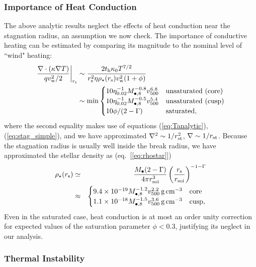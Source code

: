 \documentclass[usenatbib,fleqn]{mn2e}
\begin{document}
\subsubsection{Importance of Heat Conduction}

The above analytic results neglect the effects of heat conduction near the stagnation radius, an assumption we now check.  The importance of conductive heating can be estimated by comparing its magnitude to the nominal level of ``wind" heating:
\begin{align}
  \left.\frac{\nabla\cdot(\kappa \nabla T)}{q v_{\rm
w}^{2}/2}\right|_{r_{\rm s}} &\sim \frac{2t_{\rm h}\kappa_0
T^{7/2}}{r_{\rm s}^{2}\eta \rho_{\star}(r_{\rm s}) v_{\rm w}^{2}(1+\phi)}
\nonumber \\ &\sim {\rm min}
  \begin{cases}
  10 \eta_{0.02}^{-1}
M_{\bullet,8}^{-0.8} v_{500}^{6.8} &  \text{unsaturated (core)}\\
 10 \eta_{0.02}^{-1}
M_{\bullet,8}^{-0.5} v_{500}^{5.4} &  \text{unsaturated (cusp)}\\
  10 \phi/(2-\Gamma) & \text{saturated},
  \end{cases}
 \label{eq:rhors}
\end{align}
where the second equality makes use of equations (\ref{eq:Tanalytic}), (\ref{eq:stag_simple}), and we have approximated $\nabla^{2} \sim 1/r_{\rm st}^{2}$, $\nabla \sim 1/r_{\rm st}$.  Because the stagnation radius is usually well inside the break radius, we have approximated the stellar density as (eq.~[\ref{eq:rhostar}])
\begin{eqnarray}
  \rho_{\star}(r_{\rm s}) &\simeq& \frac{M_{\bullet}(2-\Gamma)}{4\pi r_{\rm soi}^{3}}\left(\frac{r_{\rm s}}{r_{\rm soi}}\right)^{-1-\Gamma} \nonumber \\
 &\approx& \begin{cases}
    9.4 \times 10^{-19}M_{\bullet,8}^{-1.2}v_{500}^{2.2}\,{\rm g\,cm^{-3}}
    & \text{core} \\
    1.1 \times 10^{-18} M_{\bullet,8}^{-1.5}v_{500}^{3.6}
    \,{\rm g\,cm^{-3}}  & \text{cusp}, 
  \end{cases}
  \label{eq:rhostarrs}
\end{eqnarray}
Even in the saturated case, heat conduction is at most an order unity correction for expected values of the saturation parameter $\phi < 0.3$, justifying its neglect in our analysis.  

\subsubsection{Thermal Instability}
\end{document}
